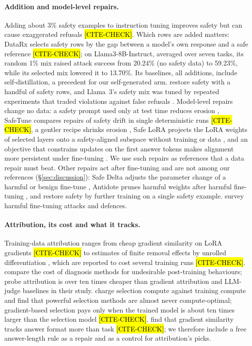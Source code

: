 \documentclass{article}
\theoremstyle{plain}
\theoremstyle{definition}
\theoremstyle{remark}
\newcommand{\ph}[1]{\hl{#1}}
\begin{document}
\paragraph{Addition and model-level repairs.}
Adding about 3\% safety examples to instruction tuning improves safety but can
cause exaggerated refusals \citep{bianchi2024safety} \ph{[CITE-CHECK]}. Which
rows are added matters: DataRx selects safety rows by the gap between a model's
own response and a safe reference \citep{zhang2026datarx} \ph{[CITE-CHECK]}; on
Llama3-8B-Instruct, averaged over seven tasks, its random 1\% mix raised attack
success from 20.24\% (no safety data) to 59.23\%, while its selected mix
lowered it to 13.70\%. Its baselines, all additions, include self-distillation,
a precedent for our self-generated arm. \citet{guo2026safety} restore safety with a handful of
safety rows, and Llama~3's safety mix was tuned by repeated experiments that
traded violations against false refusals \citep{grattafiori2024llama}.
Model-level repairs change no data: a safety prompt used only at test time
reduces erosion \citep[PTST;][]{lyu2024keeping}, SafeTune compares repairs of
safety drift in single deterministic runs \citep{seth2026safetune}
\ph{[CITE-CHECK]}, a gentler recipe shrinks erosion \citep{kim2025rethinking},
Safe LoRA projects the LoRA weights of selected layers onto a safety-aligned
subspace without training or data \citep{hsu2024safelora}, and an objective
that constrains updates on the first answer tokens makes alignment more
persistent under fine-tuning \citep{qi2025shallow}. We use such repairs as
references that a data repair must beat. Other repairs act after fine-tuning
and are not among our references (\S\ref{sec:discussion}): Safe Delta adjusts
the parameter change of a harmful or benign fine-tune \citep{lu2025safedelta},
Antidote prunes harmful weights after harmful fine-tuning
\citep{huang2025antidote}, and \citet{zhang2026oneshot} restore safety by
further training on a single safety example. \citet{huang2024survey} survey
harmful fine-tuning attacks and defences.

\paragraph{Attribution, its cost and what it tracks.}
Training-data attribution ranges from cheap gradient similarity on LoRA
gradients \citep[LESS;][]{xia2024less} \ph{[CITE-CHECK]} to estimates of finite
removal effects by unrolled differentiation \citep[SOURCE;][]{bae2024training},
which are reported to cost several training runs \ph{[CITE-CHECK]}.
\citet{xiao2026probe} compare the cost of diagnosis methods for undesirable
post-training behaviours; probe attribution is over ten times cheaper than
gradient attribution and LLM-judge baselines in their study.
\citet{yin2025compute} charge selection compute against training compute and
find that powerful selection methods are almost never compute-optimal;
gradient-based selection pays only when the trained model is about ten times
larger than the selection model \ph{[CITE-CHECK]}. \citet{kim2026form} find
that gradient similarity tracks answer format more than task
\ph{[CITE-CHECK]}; we therefore include a free answer-length rule as a repair
and as a control for attribution's picks.
\end{document}
